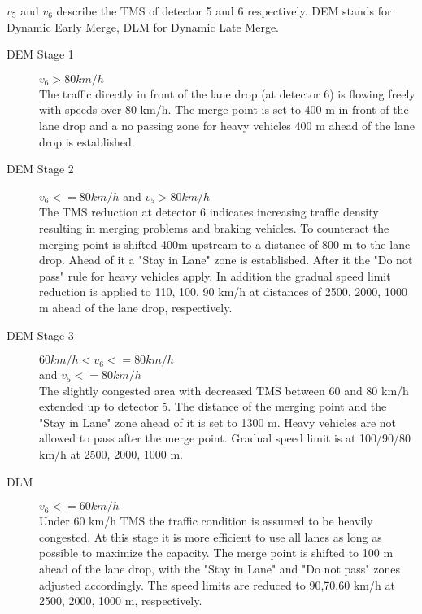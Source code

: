 \documentclass{sig-alternate}
\begin{document}
$v_5$ and $v_6$ describe the TMS of detector 5 and 6 respectively. DEM stands for Dynamic Early Merge, DLM for Dynamic Late Merge.
\begin{description}
\item[DEM Stage 1] $v_6 > 80 km/h$ \\
The traffic directly in front of the lane drop (at detector 6) is flowing freely with speeds over 80 km/h. The merge point is set to 400 m in front of the lane drop and a no passing zone for heavy vehicles 400 m ahead of the lane drop is established. 
\item[DEM Stage 2] $v_6<= 80 km/h$ and $v_5>80 km/h$ \\ 
The TMS reduction at detector 6 indicates increasing traffic density resulting in merging problems and braking vehicles. To counteract the merging point is shifted 400m upstream to a distance of 800 m to the lane drop. Ahead of it a "Stay in Lane" zone is established. After it the "Do not pass" rule for heavy vehicles apply. In addition the gradual speed limit reduction is applied to 110, 100, 90 km/h at distances of 2500, 2000, 1000 m ahead of the lane drop, respectively. 
\item[DEM Stage 3] $60 km/h < v_6 <= 80 km/h$ \\ and $v_5 <= 80 km/h$\\
The slightly congested area with decreased TMS between 60 and 80 km/h extended up to detector 5. The distance of the merging point and the "Stay in Lane" zone ahead of it is set to 1300 m. Heavy vehicles are not allowed to pass after the merge point. Gradual speed limit is at 100/90/80 km/h at 2500, 2000, 1000 m.
\item [DLM] $v_6 <= 60 km /h$ \\
Under 60 km/h TMS the traffic condition is assumed to be heavily congested. At this stage it is more efficient to use all lanes as long as possible to maximize the capacity. The merge point is shifted to 100 m ahead of the lane drop, with the "Stay in Lane" and "Do not pass" zones adjusted accordingly. The speed limits are reduced to 90,70,60 km/h at 2500, 2000, 1000 m, respectively.
\end{description}
\end{document}
